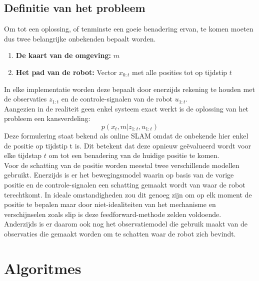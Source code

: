 \documentclass{book}
\begin{document}
\subsection{Definitie van het probleem}
Om tot een oplossing, of tenminste een goeie benadering ervan, te komen moeten dus twee belangrijke onbekenden bepaalt worden.
\begin{enumerate}
	\item \textbf{De kaart van de omgeving: }$m$
	\item \textbf{Het pad van de robot: }Vector $x_{0:t}$ met alle posities tot op tijdstip $t$
\end{enumerate}
In elke implementatie worden deze bepaalt door enerzijds rekening te houden met de observaties $z_{1:t}$ en de controle-signalen van de robot $u_{1:t}$.\\
Aangezien in de realiteit geen enkel systeem exact werkt is de oplossing van het probleem een kansverdeling:
\begin{equation*}
p( x_{t}  ,  m | z_{1:t}  ,  u_{1:t})
\end{equation*}
Deze formulering staat bekend als online SLAM omdat de onbekende hier enkel de positie op tijdstip t is. Dit betekent dat deze opnieuw geëvalueerd wordt voor elke tijdstap $t$ om tot een benadering van de huidige positie te komen.\\
Voor de schatting van de positie worden meestal twee verschillende modellen gebruikt. Enerzijds is er het bewegingsmodel waarin op basis van de vorige positie en de controle-signalen een schatting gemaakt wordt van waar de robot terechtkomt. In ideale omstandigheden zou dit genoeg zijn om op elk moment de positie te bepalen maar door niet-idealiteiten van het mechanisme en verschijnselen zoals slip is deze feedforward-methode zelden voldoende. Anderzijds is er daarom ook nog het observatiemodel die gebruik maakt van de observaties die gemaakt worden om te schatten waar de robot zich bevindt.
\section{Algoritmes}
\end{document}
